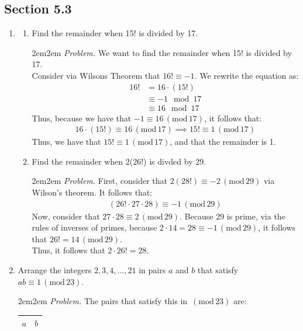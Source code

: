 \documentclass[10pt,oneside]{book}
\newcommand{\gspc}{\vspace{0.13cm}} %
\newcommand{\gline}{\gspc\\} %
\newcommand{\gmod}[1]{\,(\text{mod}\,#1)}
\let\endoldproof\endproof
\newenvironment{problem}[1]
  {\vspace{-0.1cm}\begin{coloredadjust}\begin{adjustwidth}{2em}{2em}
   \textit{Problem. }#1}
  {\endoldproof
\end{adjustwidth}\end{coloredadjust}\gspc}
\begin{document}
\newcommand{\cg}[1]{\color{OliveGreen}#1\color{white}}
\newcommand{\cb}[1]{\color{BlueViolet}#1\color{white}}

\subsection*{Section 5.3}
\begin{enumerate}
	\item \begin{enumerate}
		\item Find the remainder when 15! is divided by 17.
		\begin{problem}
			We want to find the remainder when 15! is divided by 17.\gline
			Consider via Wilsons Theorem that $16!\equiv -1$. We rewrite the equation as:
			\begin{align*}
				16! &= 16\cdot (15!)\\
				&\equiv -1\mod 17\\
				&\equiv 16 \mod 17
			\end{align*}
			Thus, because we have that $-1\equiv 16\gmod{17}$, it follows that:
			\begin{align*}
				16\cdot (15!)\equiv 16 \gmod{17}\implies 15!\equiv 1\gmod{17}
			\end{align*} 
			Thus, we have that $15!\equiv 1 \gmod{17}$, and that the remainder is 1. 
		\end{problem}
		\item Find the remainder when 2(26!) is divded by 29.
		\begin{problem}
			First, consider that $2(28!)\equiv -2 \gmod{29}$ via Wilson's theorem. It follows that:
			\begin{align*}
				(26! \cdot 27\cdot 28) \equiv -1 \gmod{29}
			\end{align*} 
			Now, consider that $27\cdot 28 \equiv 2 \gmod{29}$. Because 29 is prime, via the rules of inverses of primes, because $2\cdot 14 =28\equiv -1\gmod{29}$, it follows that $26! = 14\gmod{29}$. \gline
			Thus, it follows that $2\cdot 26! = 28$.
		\end{problem}
	\end{enumerate}
	\item [3.] Arrange the integers $2,3,4,\ldots, 21$ in pairs $a$ and $b$ that satisfy $ab \equiv 1\gmod{23}$.
	\begin{problem}
		The pairs that satisfy this in $\gmod{23}$ are:
		\begin{center}
			\begin{tabular}{c|c}
				$a$ & $b$\\\hline

\end{tabular}
\end{center}
\end{problem}
\end{enumerate}
\end{document}
